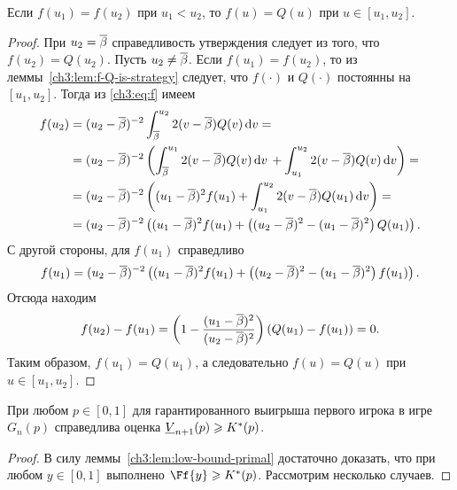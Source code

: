 {\begin{lemma}
  \label{ch3:lem:f=Q}
  Если $f(u_1) = f(u_2)$ при $u_1 < u_2$, то $f(u) = Q(u)$ при $u \in [u_1, u_2]$.
\end{lemma}
\begin{proof}
  При $u_2 = {{\overline{\beta}}}$ справедливость утверждения следует из того, что $f(u_2) = Q(u_2)$.
  Пусть $u_2 \neq {{\overline{\beta}}}$. 
  Если $f(u_1) = f(u_2)$, то из леммы~\ref{ch3:lem:f-Q-is-strategy} следует, что $f(\cdot)$ и $Q(\cdot)$ постоянны на $[u_1, u_2]$.
  Тогда из \eqref{ch3:eq:f} имеем
  \begin{align*}
    f(u_2)
    &= (u_2 - {{\overline{\beta}}})^{-2} \int_{{{\overline{\beta}}}}^{u_2} 2 (v - {{\overline{\beta}}}) Q(v) \mathop{}\!\mathrm{d} v = \\
    &= (u_2 - {{\overline{\beta}}})^{-2} \left(
      \int_{{{\overline{\beta}}}}^{u_1} 2 (v - {{\overline{\beta}}}) Q(v) \mathop{}\!\mathrm{d} v \, +
      \int_{u_1}^{u_2} 2 (v - {{\overline{\beta}}}) Q(v) \mathop{}\!\mathrm{d} v
      \right) = \\
    &= (u_2 - {{\overline{\beta}}})^{-2} \left(
      (u_1 - {{\overline{\beta}}})^2 f(u_1) +
      \int_{u_1}^{u_2} 2 (v - {{\overline{\beta}}}) Q(u_1) \mathop{}\!\mathrm{d} v
      \right) = \\
    &= (u_2 - {{\overline{\beta}}})^{-2} \left(
      (u_1 - {{\overline{\beta}}})^2 f(u_1) +
      \left( (u_2 - {{\overline{\beta}}})^2 - (u_1 - {{\overline{\beta}}})^2 \right) Q(u_1)
      \right).
  \end{align*}
  С другой стороны, для $f(u_1)$ справедливо
  \begin{equation*}
    f(u_1) = (u_2 - {{\overline{\beta}}})^{-2} \left(
      (u_1 - {{\overline{\beta}}})^2 f(u_1) +
      \left( (u_2 - {{\overline{\beta}}})^2 - (u_1 - {{\overline{\beta}}})^2 \right) f(u_1)
    \right).
  \end{equation*}
  Отсюда находим
  \begin{equation*}
    f(u_2) - f(u_1) = \left(1 - \frac{(u_1 - {{\overline{\beta}}})^2}{(u_2 - {{\overline{\beta}}})^2}\right)(Q(u_1) - f(u_1)) = 0.
  \end{equation*}
  Таким образом, $f(u_1) = Q(u_1)$, а следовательно $f(u) = Q(u)$ при $u \in [u_1, u_2]$.
\end{proof}

\begin{theorem}\label{ch3:thm:V-bound}
  При любом $p \in [0, 1]$ для гарантированного выигрыша первого игрока в игре $G_n(p)$ справедлива оценка $\LV{n+1}(p) \geqslant K^*(p)$.
\end{theorem}
\begin{proof}
  В силу леммы~\ref{ch3:lem:low-bound-primal} достаточно доказать, что при любом $y \in [0, 1]$ выполнено $\Ff{y} \geqslant K^*(p)$.
  Рассмотрим несколько случаев.


\end{proof}}
